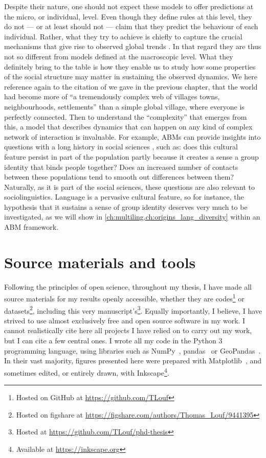 \documentclass[../thesis.tex]{subfiles}
\begin{document}
Despite their nature, one should not expect these models to offer predictions at the
micro, or individual, level. Even though they define rules at this level, they do not
--- or at least should not --- claim that they predict the behaviour of each individual.
Rather, what they try to achieve is chiefly to capture the crucial mechanisms that give
rise to observed global trends \cite{MacyFactorsActors2002}. In that regard they are
thus not so different from models defined at the macroscopic level. What they definitely
bring to the table is how they enable us to study how some properties of the social
structure may matter in sustaining the observed dynamics. We here reference again to the
citation of  we gave in
the previous chapter, that the world had become more of ``a tremendously complex web of
villages towns, neighbourhoods, settlements'' than a simple global village, where
everyone is perfectly connected. Then to understand the ``complexity'' that emerges from
this, a model that describes dynamics that can happen on any kind of complex network of
interaction is invaluable. For example, \acp{ABM} can provide insights into questions
with a long history in social sciences \cite{LatanePsychologySocial1981}, such as: does
this cultural feature persist in part of the population partly because it creates a
sense a group identity that binds people together? Does an increased number of contacts
between these populations tend to smooth out differences between them? Naturally, as it
is part of the social sciences, these questions are also relevant to sociolinguistics.
Language is a pervasive cultural feature, so for instance, the hypothesis that it
sustains a sense of group identity deserves very much to be investigated, as we will
show in \cref{ch:multiling,ch:origins_lang_diversity} within an \ac{ABM} framework.


\section{Source materials and tools}
Following the principles of open science, throughout my thesis, I have made all source
materials for my results openly accessible, whether they are codes\footnote{Hosted on
GitHub at \url{https://github.com/TLouf}} or datasets\footnote{Hosted on figshare at
\url{https://figshare.com/authors/Thomas_Louf/9441395}}, including this very
manuscript's\footnote{Hosted at \url{https://github.com/TLouf/phd-thesis}}. Equally importantly, I believe, I have strived to use almost exclusively free
and open source software in my work. I cannot realistically cite here all projects I
have relied on to carry out my work, but I can cite a few central ones. I wrote all my
code in the Python 3 programming language, using libraries such as
NumPy~\cite{HarrisArrayProgramming2020},
pandas~\cite{teamPandasdevPandas2020} or
GeoPandas~\cite{JordahlGeopandasGeopandas2020}. In their vast majority, figures
presented here were prepared with Matplotlib~\cite{HunterMatplotlib2D2007}, and
sometimes edited, or entirely drawn, with Inkscape\footnote{Available at
\url{https://inkscape.org}}.
\end{document}

